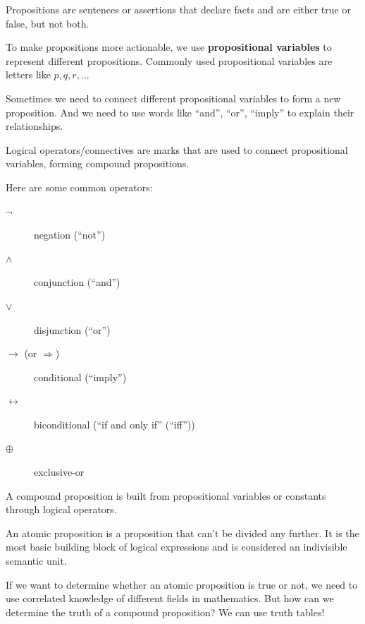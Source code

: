 \begin{definition}[Proposition]
Propositions are sentences or assertions that declare facts and are either true or false, but not both.
\end{definition}

To make propositions more actionable, we use \textbf{propositional variables} to represent different propositions. Commonly used propositional variables are letters like $p, q, r, \dots$

Sometimes we need to connect different propositional variables to form a new proposition. And we need to use words like “and”, “or”, “imply” to explain their relationships.

\begin{definition}
Logical operators/connectives are marks that are used to connect propositional variables, forming compound propositions.
\end{definition}

Here are some common operators:
\begin{description}
    \item[$\neg$] negation (“not”)
    \item[$\wedge$] conjunction (“and”)
    \item[$\vee$] disjunction (“or”)
    \item[$\to$ (or $\Rightarrow$)] conditional (“imply”)
    \item[$\leftrightarrow$] biconditional (“if and only if” (“iff”))
    \item[$\oplus$] exclusive-or
\end{description}

\begin{definition}
A compound proposition is built from propositional variables or constants through logical operators.
\end{definition}

\begin{definition}
An atomic proposition is a proposition that can't be divided any further. It is the most basic building block of logical expressions and is considered an indivisible semantic unit.
\end{definition}

If we want to determine whether an atomic proposition is true or not, we need to use correlated knowledge of different fields in mathematics. But how can we determine the truth of a compound proposition? We can use truth tables!

